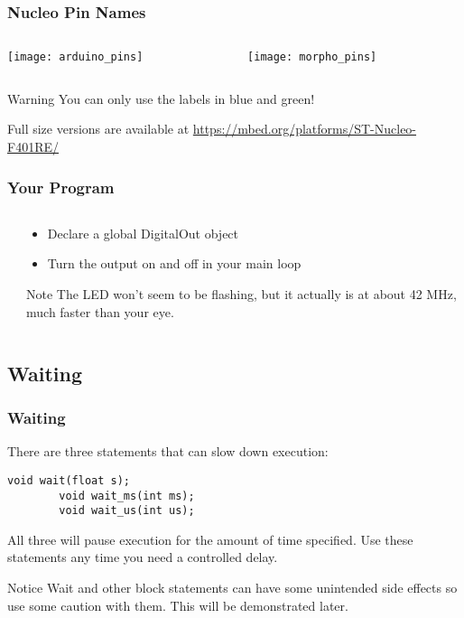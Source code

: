 \begin{frame}
	\frametitle{Nucleo Pin Names}
	\begin{columns}[c]
		\begin{column}{0.5\textwidth}
			\texttt{[image: arduino\_pins]}
		\end{column}
		\begin{column}{0.5\textwidth}
			\texttt{[image: morpho\_pins]}
		\end{column}
	\end{columns}
	\begin{block}{Warning}
		You can only use the labels in blue and green!
	\end{block}
	\begin{center}
		\small Full size versions are available at \url{https://mbed.org/platforms/ST-Nucleo-F401RE/}
	\end{center}
\end{frame}

\begin{frame}
	\frametitle{Your Program}
	\begin{columns}[c]
		\begin{column}{0.55\textwidth}
			
		\end{column}
		\begin{column}{0.45\textwidth}
			\begin{itemize}
				\item Declare a global DigitalOut object
				\item Turn the output on and off in your main loop
			\end{itemize}
			\begin{block}{Note}
				The LED won't seem to be flashing, but it actually is at about 42 MHz, much faster than your eye.
			\end{block}
		\end{column}
	\end{columns}
\end{frame}

\subsection{Waiting}
\label{sub:waiting}
\begin{frame}[fragile]
	\frametitle{Waiting}
	There are three statements that can slow down execution:
	\begin{lstlisting}[numbers=none]
		void wait(float s);
		void wait_ms(int ms);
		void wait_us(int us);
	\end{lstlisting}
	All three will pause execution for the amount of time specified. Use these statements any time you need a controlled delay.
	\begin{block}{Notice}
		Wait and other block statements can have some unintended side effects so use some caution with them. This will be demonstrated later.
	\end{block}
\end{frame}

